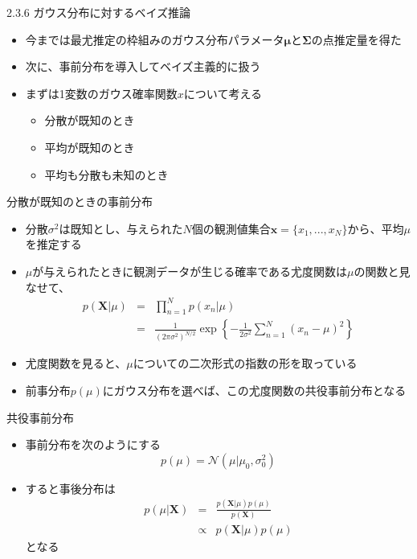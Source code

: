 \begin{frame}{2.3.6 ガウス分布に対するベイズ推論}
 \begin{itemize}
  \item 今までは最尤推定の枠組みのガウス分布パラメータ$\bm{\mu}$と$\bm{\Sigma}$の点推定量を得た
  \item 次に、事前分布を導入してベイズ主義的に扱う
  \item まずは1変数のガウス確率関数$x$について考える
        \begin{itemize}
         \item 分散が既知のとき
         \item 平均が既知のとき
         \item 平均も分散も未知のとき
        \end{itemize}
 \end{itemize}
\end{frame}

\begin{frame}{分散が既知のときの事前分布}
 \begin{itemize}
  \item \alert{分散$\sigma^2$は既知}とし、与えられた$N$個の観測値集合$\bm{x}=\{x_1,...,x_N\}$から、平均$\mu$を推定する
  \item $\mu$が与えられたときに観測データが生じる確率である尤度関数は$\mu$の関数と見なせて、
        \begin{eqnarray*}
         p(\bm{X}|\mu) &= &\prod_{n=1}^{N}p(x_n|\mu) \\
         &=& \frac{1}{(2\pi\sigma^2)^{N/2}}\exp\left\{-\frac{1}{2\sigma^2}\sum_{n=1}^{N}(x_n-\mu)^2\right\}
        \end{eqnarray*}
  \item 尤度関数を見ると、$\mu$についての二次形式の指数の形を取っている
  \item 前事分布$p(\mu)$にガウス分布を選べば、この尤度関数の共役事前分布となる
 \end{itemize}
\end{frame}

\begin{frame}{共役事前分布}
 \begin{itemize}

  \item 事前分布を次のようにする
        \begin{equation}
         p(\mu) = \mathcal{N}(\mu|\mu_0,\sigma_0^2)
        \end{equation}
  \item すると事後分布は
        \begin{eqnarray}
         p(\mu|\bm{X})&=&\frac{p(\bm{X}|\mu)p(\mu)}{p(\bm{X})} \nonumber \\
         &\propto &p(\bm{X}|\mu)p(\mu)
        \end{eqnarray}
        となる
 \end{itemize}
\end{frame}

